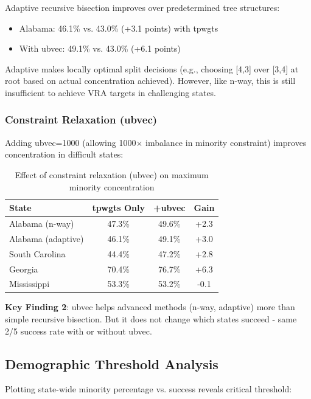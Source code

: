 Adaptive recursive bisection improves over predetermined tree structures:

\begin{itemize}
\item Alabama: 46.1\% vs. 43.0\% (+3.1 points) with tpwgts
\item With ubvec: 49.1\% vs. 43.0\% (+6.1 points)
\end{itemize}

Adaptive makes locally optimal split decisions (e.g., choosing [4,3] over [3,4] at root based on actual concentration achieved). However, like n-way, this is still insufficient to achieve VRA targets in challenging states.

\subsubsection{Constraint Relaxation (ubvec)}

Adding ubvec=1000 (allowing 1000$\times$ imbalance in minority constraint) improves concentration in difficult states:

\begin{table}[h]
\centering
\begin{tabular}{lccc}
\toprule
State & tpwgts Only & +ubvec & Gain \\
\midrule
Alabama (n-way) & 47.3\% & 49.6\% & +2.3 \\
Alabama (adaptive) & 46.1\% & 49.1\% & +3.0 \\
South Carolina & 44.4\% & 47.2\% & +2.8 \\
Georgia & 70.4\% & 76.7\% & +6.3 \\
Mississippi & 53.3\% & 53.2\% & -0.1 \\
\bottomrule
\end{tabular}
\caption{Effect of constraint relaxation (ubvec) on maximum minority concentration}
\label{tab:ubvec}
\end{table}

\textbf{Key Finding 2}: ubvec helps advanced methods (n-way, adaptive) more than simple recursive bisection. But it does not change which states succeed - same 2/5 success rate with or without ubvec.

\subsection{Demographic Threshold Analysis}

Plotting state-wide minority percentage vs. success reveals critical threshold:

